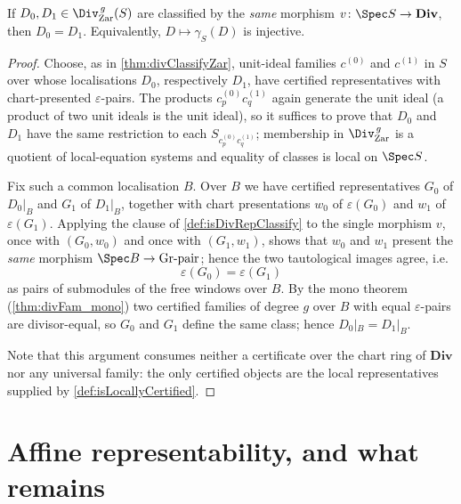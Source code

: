 \begin{theorem}
  \label{thm:eq_of_isDivRepClassify}
  \leanok
  If \(D_0, D_1 \in \Div^{\,g}_{\mathrm{Zar}}(S)\) are classified by the \emph{same}
  morphism \(v \colon \Spec S \to \mathbf{Div}\), then \(D_0 = D_1\). Equivalently,
  \(D \mapsto \gamma_S(D)\) is injective.
\end{theorem}
\begin{proof}
  \leanok
  Choose, as in \ref{thm:divClassifyZar}, unit-ideal families \(c^{(0)}\) and \(c^{(1)}\) in
  \(S\) over whose localisations \(D_0\), respectively \(D_1\), have certified
  representatives with chart-presented \(\varepsilon\)-pairs. The products
  \(c^{(0)}_p c^{(1)}_q\) again generate the unit ideal (a product of two unit ideals is the
  unit ideal), so it suffices to prove that \(D_0\) and \(D_1\) have the same restriction to
  each \(S_{c^{(0)}_p c^{(1)}_q}\); membership in \(\Div^{\,g}_{\mathrm{Zar}}\) is a
  quotient of local-equation systems and equality of classes is local on \(\Spec S\).

  Fix such a common localisation \(B\). Over \(B\) we have certified representatives
  \(G_0\) of \(D_0|_B\) and \(G_1\) of \(D_1|_B\), together with chart presentations \(w_0\)
  of \(\varepsilon(G_0)\) and \(w_1\) of \(\varepsilon(G_1)\). Applying the clause of
  \ref{def:isDivRepClassify} to the single morphism \(v\), once with \((G_0, w_0)\) and once
  with \((G_1, w_1)\), shows that \(w_0\) and \(w_1\) present the \emph{same} morphism
  \(\Spec B \to \mathrm{Gr}\text{-pair}\); hence the two tautological images agree, i.e.
  \[
    \varepsilon(G_0) = \varepsilon(G_1)
  \]
  as pairs of submodules of the free windows over \(B\). By the mono theorem
  (\ref{thm:divFam_mono}) two certified families of degree \(g\) over \(B\) with equal
  \(\varepsilon\)-pairs are divisor-equal, so \(G_0\) and \(G_1\) define the same class;
  hence \(D_0|_B = D_1|_B\).

  Note that this argument consumes neither a certificate over the chart ring of
  \(\mathbf{Div}\) nor any universal family: the only certified objects are the local
  representatives supplied by \ref{def:isLocallyCertified}.
\end{proof}

\section{Affine representability, and what remains}
\label{sec:divrep}

